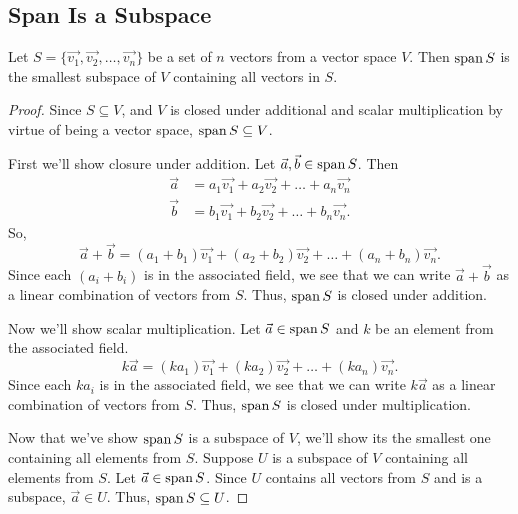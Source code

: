 \subsection{Span Is a Subspace}
\begin{theorem}
	Let $S = \{\vec{v_1}, \vec{v_2}, \dots, \vec{v_n}\}$ be a set of $n$ vectors from a vector space $V$.
	Then $\operatorname{span}{S}$ is the smallest subspace of $V$ containing all vectors in $S$.
\end{theorem}
\begin{proof}
	Since $S \subseteq V$, and $V$ is closed under additional and scalar multiplication by virtue of being a vector space, $\operatorname{span}{S} \subseteq V$.
	
	First we'll show closure under addition.
	Let $\vec{a}, \vec{b} \in \operatorname{span}{S}$.
	Then
	\begin{align*}
		\vec{a} &= a_1\vec{v_1} + a_2\vec{v_2} + \dots + a_n\vec{v_n} \\
		\vec{b} &= b_1\vec{v_1} + b_2\vec{v_2} + \dots + b_n\vec{v_n}.
	\end{align*}
	So,
	\begin{equation*}
		\vec{a} + \vec{b} = (a_1 + b_1)\vec{v_1} + (a_2 + b_2)\vec{v_2} + \dots + (a_n + b_n)\vec{v_n}.
	\end{equation*}
	Since each $(a_i + b_i)$ is in the associated field, we see that we can write $\vec{a} + \vec{b}$ as a linear combination of vectors from $S$.
	Thus, $\operatorname{span}{S}$ is closed under addition.
	
	Now we'll show scalar multiplication.
	Let $\vec{a} \in \operatorname{span}{S}$ and $k$ be an element from the associated field.
	\begin{equation*}
		k\vec{a} = (ka_1)\vec{v_1} + (ka_2)\vec{v_2} + \dots + (ka_n)\vec{v_n}.
	\end{equation*}
	Since each $ka_i$ is in the associated field, we see that we can write $k\vec{a}$ as a linear combination of vectors from $S$.
	Thus, $\operatorname{span}{S}$ is closed under multiplication.
	
	Now that we've show $\operatorname{span}{S}$ is a subspace of $V$, we'll show its the smallest one containing all elements from $S$.
	Suppose $U$ is a subspace of $V$ containing all elements from $S$.
	Let $\vec{a} \in \operatorname{span}{S}$.
	Since $U$ contains all vectors from $S$ and is a subspace, $\vec{a} \in U$.
	Thus, $\operatorname{span}{S} \subseteq U$.
\end{proof}